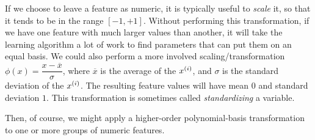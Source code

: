 If we choose to leave a feature as numeric, it is typically useful to
  {\em scale} it, so that it tends to be in the range $[-1, +1]$.
Without performing this transformation, if we have one feature with
much larger values than another, it will take the learning algorithm a
lot of work to find parameters that can put them on an equal basis.
We could also perform a more involved scaling/transformation
$\phi(x) = \dfrac{x - \overline{x}}{\sigma}$, where $\overline{x}$
is the average of the $x^{(i)}$, and $\sigma$ is the standard deviation of
the $x^{(i)}$.  The resulting feature values will have mean $0$ and
standard deviation $1$.   This transformation is sometimes called {\em
    standardizing} a variable.

Then, of course, we might apply a higher-order polynomial-basis
transformation to one or more groups of numeric features.




